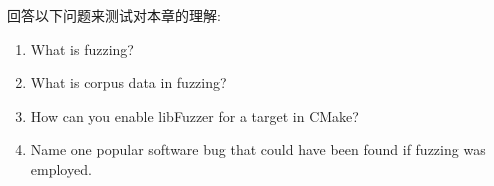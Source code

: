 回答以下问题来测试对本章的理解:

\begin{enumerate}
\item 
What is fuzzing?

\item 
What is corpus data in fuzzing?

\item 
How can you enable libFuzzer for a target in CMake?

\item 
Name one popular software bug that could have been found if fuzzing was employed.
\end{enumerate}